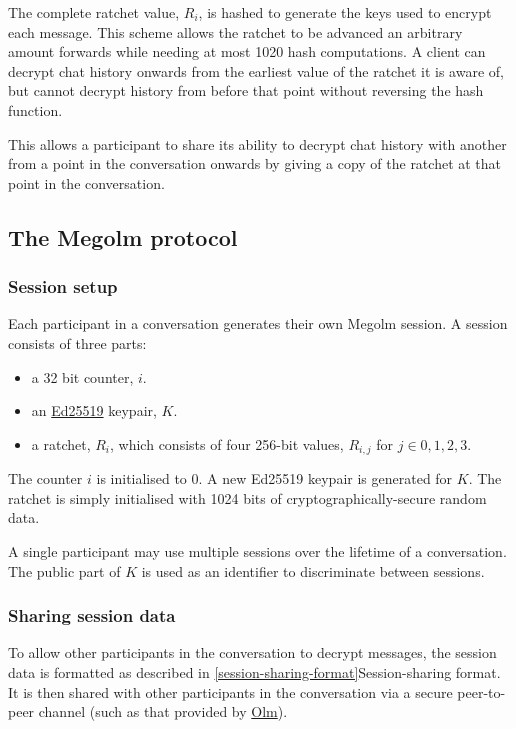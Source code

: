 \documentclass[10pt]{article}
\begin{document}
The complete ratchet value, \(R_{i}\), is hashed to generate the keys
used to encrypt each message. This scheme allows the ratchet to be
advanced an arbitrary amount forwards while needing at most 1020 hash
computations. A client can decrypt chat history onwards from the
earliest value of the ratchet it is aware of, but cannot decrypt history
from before that point without reversing the hash function.

This allows a participant to share its ability to decrypt chat history
with another from a point in the conversation onwards by giving a copy
of the ratchet at that point in the conversation.

\subsection{The Megolm protocol}\label{the-megolm-protocol}

\subsubsection{Session setup}\label{session-setup}

Each participant in a conversation generates their own Megolm session. A
session consists of three parts:

\begin{itemize}
\item
  a 32 bit counter, \(i\).
\item
  an \href{http://ed25519.cr.yp.to/}{Ed25519} keypair, \(K\).
\item
  a ratchet, \(R_i\), which consists of four 256-bit values, \(R_{i,j}\)
  for \(j \in {0,1,2,3}\).
\end{itemize}

The counter \(i\) is initialised to \(0\). A new Ed25519 keypair is
generated for \(K\). The ratchet is simply initialised with 1024 bits of
cryptographically-secure random data.

A single participant may use multiple sessions over the lifetime of a
conversation. The public part of \(K\) is used as an identifier to
discriminate between sessions.

\subsubsection{Sharing session data}\label{sharing-session-data}

To allow other participants in the conversation to decrypt messages, the
session data is formatted as described in
\ref{session-sharing-format}{Session-sharing format}. It
is then shared with other participants in the conversation via a secure
peer-to-peer channel (such as that provided by
\href{https://gitlab.matrix.org/matrix-org/olm/blob/master/docs/olm.md}{Olm}).
\end{document}
